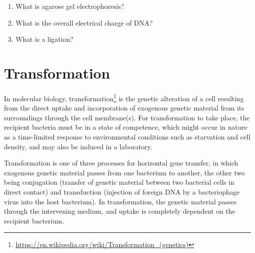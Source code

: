 \documentclass[]{book}
\providecommand{\tightlist}{%
  \setlength{\itemsep}{0pt}\setlength{\parskip}{0pt}}
\let\rmarkdownfootnote\footnote%
\def\footnote{\protect\rmarkdownfootnote}
\renewcommand{\href}[2]{#2\footnote{\url{#1}}}
\begin{document}
\begin{enumerate}
\def\labelenumi{\arabic{enumi}.}
\tightlist
\item
  What is agarose gel electrophoresis?
\item
  What is the overall electrical charge of DNA?
\item
  What is a ligation?
\end{enumerate}

\hypertarget{transformation}{%
\chapter{Transformation}\label{transformation}}

In molecular biology, \href{https://en.wikipedia.org/wiki/Transformation_(genetics)}{transformation} is the genetic alteration of a cell resulting from the direct uptake and incorporation of exogenous genetic material from its surroundings through the cell membrane(s). For transformation to take place, the recipient bacteria must be in a state of competence, which might occur in nature as a time-limited response to environmental conditions such as starvation and cell density, and may also be induced in a laboratory.

Transformation is one of three processes for horizontal gene transfer, in which exogenous genetic material passes from one bacterium to another, the other two being conjugation (transfer of genetic material between two bacterial cells in direct contact) and transduction (injection of foreign DNA by a bacteriophage virus into the host bacterium). In transformation, the genetic material passes through the intervening medium, and uptake is completely dependent on the recipient bacterium.
\end{document}
